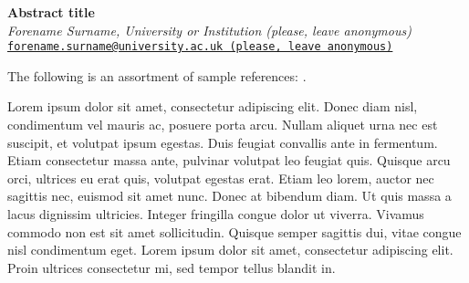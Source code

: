 \documentclass[12pt,a4paper]{article}
\newcommand\email[1]{{\tt\href{mailto:#1}{#1}}} %
\begin{document}
\raggedbottom
\begin{center}
\textbf{Abstract title}\\
\vspace{0.5em}
\textit{Forename Surname, University or Institution (please, leave anonymous)}\\
\vspace{0.25em}
\email{forename.surname@university.ac.uk (please, leave anonymous)}
\end{center}
The following is an assortment of sample references: \cite{Bermúdez-Otero2007, Kauhanen2017, Nini2017, Turton2014, Walkden2014}.

Lorem ipsum dolor sit amet, consectetur adipiscing elit. Donec diam nisl, condimentum vel mauris ac, posuere porta arcu. Nullam aliquet urna nec est suscipit, et volutpat ipsum egestas. Duis feugiat convallis ante in fermentum. Etiam consectetur massa ante, pulvinar volutpat leo feugiat quis. Quisque arcu orci, ultrices eu erat quis, volutpat egestas erat. Etiam leo lorem, auctor nec sagittis nec, euismod sit amet nunc. Donec at bibendum diam. Ut quis massa a lacus dignissim ultricies. Integer fringilla congue dolor ut viverra. Vivamus commodo non est sit amet sollicitudin. Quisque semper sagittis dui, vitae congue nisl condimentum eget. Lorem ipsum dolor sit amet, consectetur adipiscing elit. Proin ultrices consectetur mi, sed tempor tellus blandit in.
\end{document}
